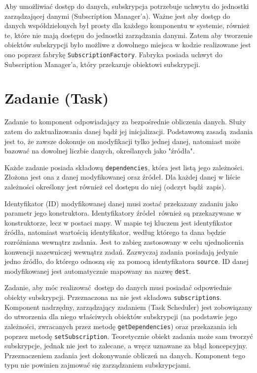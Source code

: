Aby umożliwiać dostęp do danych, subskrypcja potrzebuje uchwytu do jednostki zarządzającej danymi (Subscription Manager'a). Ważne jest aby dostęp do danych współdzielonych był prosty dla każdego komponentu w systemie, również te, które nie mają dostępu do jednostki zarządzania danymi. Zatem aby tworzenie obiektów subskrypcji było możliwe z dowolnego miejsca w kodzie realizowane jest ono poprzez fabrykę \lstinline$SubscriptionFactory$. Fabryka posiada uchwyt do Subscription Manager'a, który przekazuje obiektowi subskrypcji. 

\section{Zadanie (Task)}
Zadanie to komponent odpowiadający za bezpośrednie obliczenia danych. Służy zatem do zaktualizowania danej bądź jej inicjalizacji. Podstawową zasadą zadania jest to, że zawsze dokonuje on modyfikacji tylko jednej danej, natomiast może bazować na dowolnej liczbie danych, określanych jako "źródła". 

Każde zadanie posiada składową \lstinline$dependencies$, która jest listą jego zależności. Złożona jest ona z danej modyfikowanej oraz źródeł. Dla każdej danej w liście zależności określony jest również cel dostępu do niej (odczyt bądź zapis).

Identyfikator (ID) modyfikowanej danej musi zostać przekazany zadaniu jako parametr jego konstruktora. Identyfikatory źródeł również są przekazywane w konstruktorze, lecz w postaci mapy. W mapie tej kluczem jest identyfikator źródła, natomiast wartością identyfikator, według którego ta dana będzie rozróżniana wewnątrz zadania. Jest to zabieg zastosowany w celu ujednolicenia konwencji nazewniczej wewnątrz zadań. Zazwyczaj zadania posiadają jedynie jedno źródło, do którego odnoszą się za pomocą identyfikatora \lstinline$source$. ID danej modyfikowanej jest automatycznie mapowany na nazwę \lstinline$dest$. 

Zadanie, aby móc realizować dostęp do danych musi posiadać odpowiednie obiekty subskrypcji. Przeznaczona na nie jest składowa \lstinline$subscriptions$. Komponent nadrzędny, zarządzający zadaniem (Task Scheduler) jest zobowiązany do utworzenia dla niego właściwych obiektów subskrypcji (na podstawie jego zależności, zwracanych przez metodę \lstinline$getDependencies$) oraz przekazania ich poprzez metodę \lstinline$setSubscription$. Teoretycznie obiekt zadania może sam tworzyć subskrypcje, jednak nie jest to zalecane, a wręcz uznawane za błąd koncepcyjny. Przeznaczeniem zadania jest dokonywanie obliczeń na danych. Komponent tego typu nie powinien zajmować się zarządzaniem subskrypcjami.

